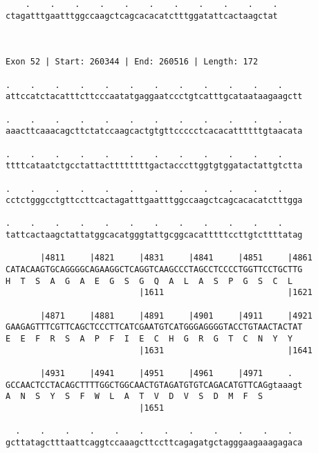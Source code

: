 \documentclass{article}
\begin{document}
\begin{Verbatim}
    .    .    .    .    .    .    .    .    .    .    .
ctagatttgaatttggccaagctcagcacacatctttggatattcactaagctat
                                                       
                                                       
 
Exon 52 | Start: 260344 | End: 260516 | Length: 172
 
.    .    .    .    .    .    .    .    .    .    .    .    
attccatctacatttcttcccaatatgaggaatccctgtcatttgcataataagaagctt
                                                            
.    .    .    .    .    .    .    .    .    .    .    .    
aaacttcaaacagcttctatccaagcactgtgttccccctcacacattttttgtaacata
                                                            
.    .    .    .    .    .    .    .    .    .    .    .    
ttttcataatctgcctattacttttttttgactacccttggtgtggatactattgtctta
                                                            
.    .    .    .    .    .    .    .    .    .    .    .    
cctctgggcctgttccttcactagatttgaatttggccaagctcagcacacatctttgga
                                                            
.    .    .    .    .    .    .    .    .    .    .    .    
tattcactaagctattatggcacatgggtattgcggcacatttttccttgtcttttatag
                                                            
       |4811     |4821     |4831     |4841     |4851     |4861
CATACAAGTGCAGGGGCAGAAGGCTCAGGTCAAGCCCTAGCCTCCCCTGGTTCCTGCTTG
H  T  S  A  G  A  E  G  S  G  Q  A  L  A  S  P  G  S  C  L  
                           |1611                         |1621
  
       |4871     |4881     |4891     |4901     |4911     |4921
GAAGAGTTTCGTTCAGCTCCCTTCATCGAATGTCATGGGAGGGGTACCTGTAACTACTAT
E  E  F  R  S  A  P  F  I  E  C  H  G  R  G  T  C  N  Y  Y  
                           |1631                         |1641
  
       |4931     |4941     |4951     |4961     |4971     .  
GCCAACTCCTACAGCTTTTGGCTGGCAACTGTAGATGTGTCAGACATGTTCAGgtaaagt
A  N  S  Y  S  F  W  L  A  T  V  D  V  S  D  M  F  S        
                           |1651                            
  
  .    .    .    .    .    .    .    .    .    .    .    .  
gcttatagctttaattcaggtccaaagcttccttcagagatgctagggaagaaagagaca
                                                            

\end{Verbatim}
\end{document}
